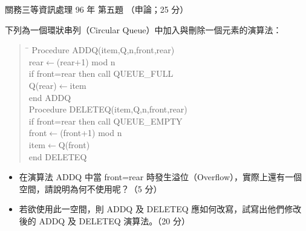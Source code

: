 \begin{pastexam}[label={px:gw3-096-ds-05}]{關務三等資訊處理 96 年 第五題}
（申論；25 分）

下列為一個環狀串列（Circular Queue）中加入與刪除一個元素的演算法：
\begin{quote}
\begin{tabbing}
\hspace*{1.5em}\=\kill
Procedure ADDQ(item,Q,n,front,rear)\\
\> rear$\leftarrow$(rear+1) mod n\\
\> if front=rear then call QUEUE\_FULL\\
\> Q(rear)$\leftarrow$item\\
end ADDQ\\
Procedure DELETEQ(item,Q,n,front,rear)\\
\> if front=rear then call QUEUE\_EMPTY\\
\> front$\leftarrow$(front+1) mod n\\
\> item$\leftarrow$Q(front)\\
end DELETEQ
\end{tabbing}
\end{quote}
\begin{itemize}[leftmargin=2.2em, nosep]
\item[㈠] 在演算法 ADDQ 中當 front=rear 時發生溢位（Overflow），實際上還有一個空間，請說明為何不使用呢？（5 分）
\item[㈡] 若欲使用此一空間，則 ADDQ 及 DELETEQ 應如何改寫，試寫出他們修改後的 ADDQ 及 DELETEQ 演算法。（20 分）
\end{itemize}
\end{pastexam}

